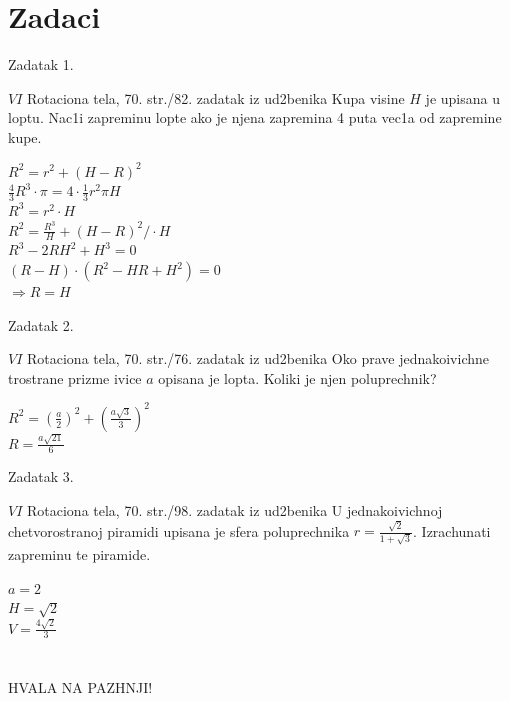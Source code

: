 \documentclass{beamer}
\begin{document}
\section{Zadaci}
\begin{frame}{Zadatak 1.}
\begin{block}{$VI$ Rotaciona tela, 70. str./82. zadatak iz ud2benika}
Kupa visine $H$ je upisana u loptu. Nac1i zapreminu lopte ako je njena zapremina 4 puta vec1a od zapremine kupe.
\end{block}
\begin{multicols}{2}
\begin{figure}[H]
    
\end{figure}

\columnbreak
{}
$R^2=r^2+(H-R)^2$\\
$\frac{4}{3}R^3\cdot\pi=4\cdot \frac{1}{3}r^2\pi H$\\
$R^3=r^2\cdot H$\\
$R^2=\frac{R^3}{H}+(H-R)^2/\cdot H$\\
$R^3-2RH^2+H^3=0$\\
$(R-H)\cdot(R^2-HR+H^2)=0$ \\
$\Rightarrow R=H$
\end{multicols}
\end{frame}
\begin{frame}{Zadatak 2.}
\begin{block}{$VI$ Rotaciona tela, 70. str./76. zadatak iz ud2benika}
Oko prave jednakoivichne trostrane prizme ivice $a$ opisana je lopta. Koliki je njen poluprechnik?
\end{block}
\begin{multicols}{2}
\begin{figure}[H]
    
\end{figure}

\columnbreak
{}
$R^2=\left(\frac{a}{2}\right)^2+\left(\frac{a\sqrt{3}}{3}\right)^2$\\
$R=\frac{a\sqrt{21}}{6}$
\end{multicols}
\end{frame}
\begin{frame}{Zadatak 3.}
  \begin{block}{$VI$ Rotaciona tela, 70. str./98. zadatak iz ud2benika}
U jednakoivichnoj  chetvorostranoj piramidi upisana je sfera poluprechnika $r=\frac{\sqrt{2}}{1+\sqrt{3}}$. Izrachunati zapreminu te piramide.
\end{block}
\begin{multicols}{2}
\begin{figure}[H]
    
\end{figure}

\columnbreak
{}
$a=2$\\
$H=\sqrt{2}$\\[2mm]
$V=\frac{4\sqrt{2}}{3}$
\end{multicols} 
\end{frame}
\section{}
\begin{frame}
\centering\LARGE HVALA NA PAZHNJI!
\end{frame}
\end{document}

